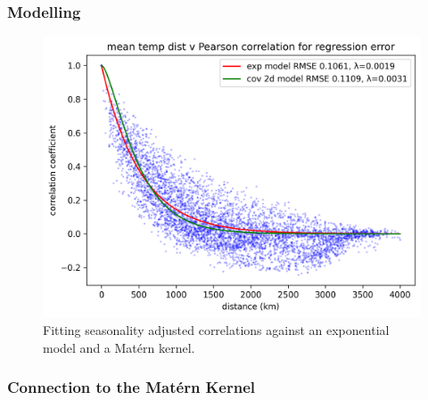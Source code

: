 \documentclass[12pt,a4paper]{article} %
\begin{document}
\subsubsection{Modelling}
\label{subsec:spatial_model}
\begin{figure}[!ht]
    \centering
    \includegraphics[width=.8\linewidth]{mean_error_corr_by_dist.png}
    \caption{Fitting seasonality adjusted correlations against an exponential model and a Mat\'{e}rn kernel.}
    \label{fig:corr_v_dist}
\end{figure}
\subsubsection{Connection to the Mat\'{e}rn Kernel}
\label{subsec:matern_connection}
\end{document}
